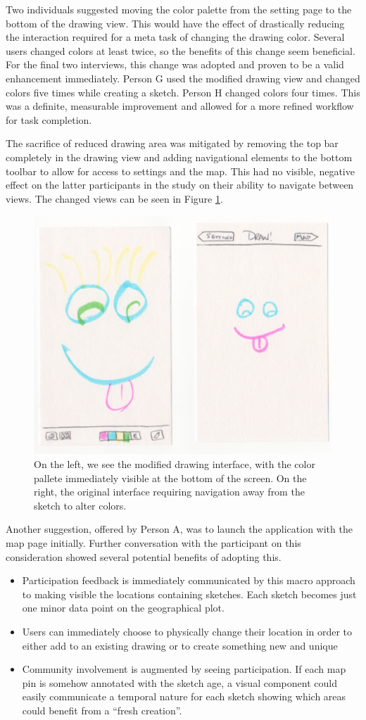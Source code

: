 \documentclass{chi2009}
\begin{document}
Two individuals suggested moving the color palette from the setting page to the
bottom of the drawing view.  This would have the effect of drastically reducing
the interaction required for a meta task of changing the drawing color.  Several
users changed colors at least twice, so the benefits of this change seem
beneficial.  For the final two interviews, this change was adopted and proven to be a valid enhancement immediately.  Person G used the modified drawing view and changed colors five times while creating a sketch.  Person H changed colors
four times.  This was a definite, measurable improvement and allowed for a more
refined workflow for task completion.

The sacrifice of reduced drawing area was mitigated by removing the top bar
completely in the drawing view and adding navigational elements to the bottom
toolbar to allow for access to settings and the map.  This had no visible,
negative effect on the latter participants in the study on their ability to
navigate between views.  The changed views can be seen in Figure \ref{fig:chg}.

\begin{figure}
\centering
\includegraphics[width=.45\textwidth]{interface.pdf}
\caption{On the left, we see the modified drawing interface, with the color
pallete immediately visible at the bottom of the screen.  On the right, the
original interface requiring navigation away from the sketch to alter colors.}
\label{fig:chg}
\end{figure}

Another suggestion, offered by Person A, was to launch the application with the
map page initially.  Further conversation with the participant on this
consideration showed several potential benefits of adopting this.
\begin{itemize}
\item Participation feedback is immediately communicated by this macro approach
to making visible the locations containing sketches.  Each sketch becomes just
one minor data point on the geographical plot.
\item Users can immediately choose to physically change their location in order
to either add to an existing drawing or to create something new and unique
\item Community involvement is augmented by seeing participation.  If each map
pin is somehow annotated with the sketch age, a visual component could easily
communicate a temporal nature for each sketch showing which areas could benefit
from a ``fresh creation''.
\end{itemize}
\end{document}
